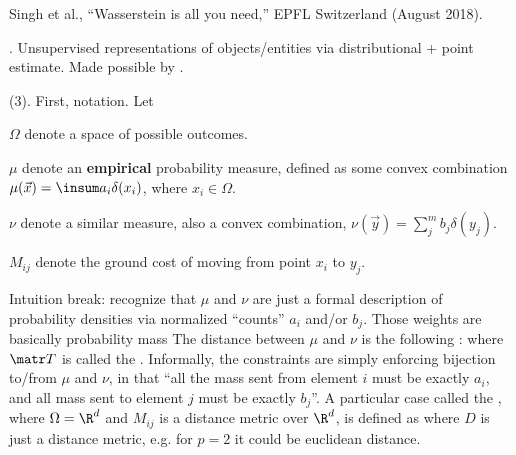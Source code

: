 \documentclass[11pt]{article}
\begin{document}
\vspace{-1em}
{\footnotesize Singh et al., ``Wasserstein is all you need,''  EPFL Switzerland (August 2018).}

\p {}. Unsupervised representations of objects/entities via distributional + point estimate. Made possible by . 

\myspace
\p {} (3). First, notation. Let\textellipsis
\begin{compactitem}
	\item $\Omega$ denote a space of possible outcomes. 
	
	\item $\mu$ denote an \textbf{empirical} probability measure, defined as some convex combination $\mu(\vec x) = \insum a_i \delta(x_i)$, where $x_i \in \Omega$. 
	
	\item $\nu$ denote a similar measure, also a convex combination, $\nu(\vec y) = \sum_j^m b_j \delta(y_j)$. 
	
	\item $M_{ij}$ denote the ground cost of moving from point $x_i$ to $y_j$. 
\end{compactitem}
Intuition break: recognize that $\mu$ and $\nu$ are just a formal description of probability densities via normalized ``counts'' $a_i$ and/or $b_j$. Those weights are basically probability mass The  distance between $\mu$ and $\nu$ is the following :
where $\matr T$ is called the . Informally, the constraints are simply enforcing bijection to/from $\mu$ and $\nu$, in that ``all the mass sent from element $i$ must be exactly $a_i$, and all mass sent to element $j$ must be exactly $b_j$''. A particular case called the , where $\Omega = \R^d$ and $M_{ij}$ is a distance metric over $\R^d$, is defined as
where $D$ is just a distance metric, e.g. for $p=2$ it could be euclidean distance. 
\end{document}
